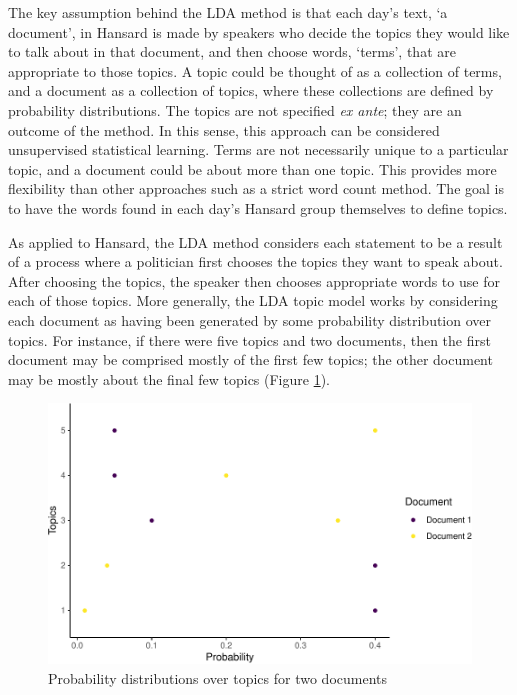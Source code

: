 \documentclass[12pt,]{article}
\theoremstyle{definition}
\theoremstyle{definition}
\theoremstyle{definition}
\theoremstyle{remark}
\begin{document}
The key assumption behind the LDA method is that each day's text, `a
document', in Hansard is made by speakers who decide the topics they
would like to talk about in that document, and then choose words,
`terms', that are appropriate to those topics. A topic could be thought
of as a collection of terms, and a document as a collection of topics,
where these collections are defined by probability distributions. The
topics are not specified \emph{ex ante}; they are an outcome of the
method. In this sense, this approach can be considered unsupervised
statistical learning. Terms are not necessarily unique to a particular
topic, and a document could be about more than one topic. This provides
more flexibility than other approaches such as a strict word count
method. The goal is to have the words found in each day's Hansard group
themselves to define topics.

As applied to Hansard, the LDA method considers each statement to be a
result of a process where a politician first chooses the topics they
want to speak about. After choosing the topics, the speaker then chooses
appropriate words to use for each of those topics. More generally, the
LDA topic model works by considering each document as having been
generated by some probability distribution over topics. For instance, if
there were five topics and two documents, then the first document may be
comprised mostly of the first few topics; the other document may be
mostly about the final few topics (Figure
\ref{fig:topicsoverdocuments}).

\begin{figure}
\centering
\includegraphics{svm-rmarkdown-article-example_files/figure-latex/topicsoverdocuments-1.pdf}
\caption{\label{fig:topicsoverdocuments}Probability distributions over
topics for two documents}
\end{figure}
\end{document}
